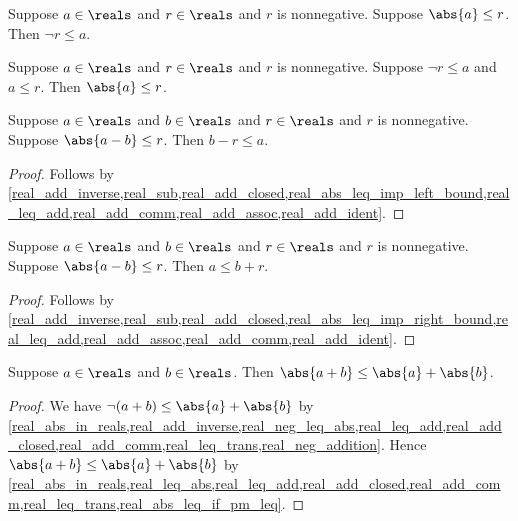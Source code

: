 \begin{proposition}\label{real_abs_leq_imp_left_bound}
    Suppose $a\in\reals$ and $r\in\reals$ and $r$ is nonnegative.
    Suppose $\abs{a} \leq r$.
    Then $\neg{r} \leq a$.
\end{proposition}

\begin{proposition}\label{real_abs_leq_from_bounds}
    Suppose $a\in\reals$ and $r\in\reals$ and $r$ is nonnegative.
    Suppose $\neg{r} \leq a$ and $a \leq r$.
    Then $\abs{a} \leq r$.
\end{proposition}

\begin{proposition}\label{real_abs_sub_leq_imp_left_bound}
    Suppose $a\in\reals$ and $b\in\reals$ and $r\in\reals$ and $r$ is nonnegative.
    Suppose $\abs{a - b} \leq r$.
    Then $b - r \leq a$.
\end{proposition}
\begin{proof}
    Follows by \cref{real_add_inverse,real_sub,real_add_closed,real_abs_leq_imp_left_bound,real_leq_add,real_add_comm,real_add_assoc,real_add_ident}.
\end{proof}

\begin{proposition}\label{real_abs_sub_leq_imp_right_bound}
    Suppose $a\in\reals$ and $b\in\reals$ and $r\in\reals$ and $r$ is nonnegative.
    Suppose $\abs{a - b} \leq r$.
    Then $a \leq b + r$.
\end{proposition}
\begin{proof}
    Follows by \cref{real_add_inverse,real_sub,real_add_closed,real_abs_leq_imp_right_bound,real_leq_add,real_add_assoc,real_add_comm,real_add_ident}.
\end{proof}

\begin{proposition}\label{real_triangle_inequality}
    Suppose $a\in\reals$ and $b\in\reals$.
    Then $\abs{a + b} \leq \abs{a} + \abs{b}$.
\end{proposition}
\begin{proof}
    We have $\neg{(a + b)} \leq \abs{a} + \abs{b}$ by \cref{real_abs_in_reals,real_add_inverse,real_neg_leq_abs,real_leq_add,real_add_closed,real_add_comm,real_leq_trans,real_neg_addition}.
    Hence $\abs{a + b} \leq \abs{a} + \abs{b}$ by \cref{real_abs_in_reals,real_leq_abs,real_leq_add,real_add_closed,real_add_comm,real_leq_trans,real_abs_leq_if_pm_leq}.
\end{proof}

